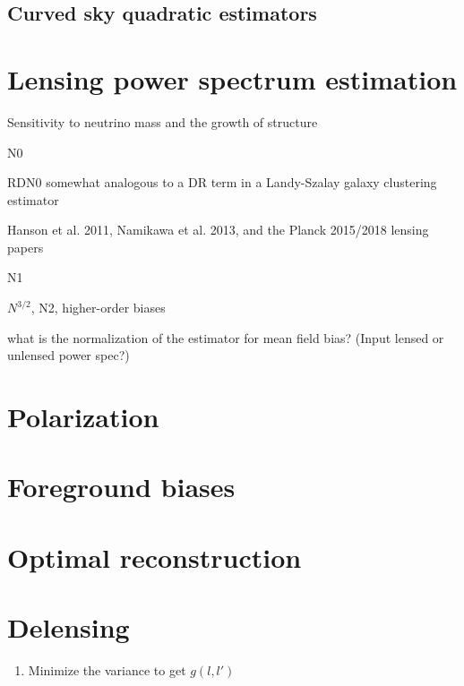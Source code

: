 \subsection{Curved sky quadratic estimators}


\section{Lensing power spectrum estimation}

Sensitivity to neutrino mass and the growth of structure


N0

RDN0 somewhat analogous to a DR term in a Landy-Szalay galaxy clustering estimator

Hanson et al. 2011, Namikawa et al. 2013, and the Planck 2015/2018 lensing papers 

\citep{Madhavacheril_2021} 

N1


$N^{3/2}$, N2, higher-order biases



what is the normalization of the  estimator for mean field bias?  (Input lensed or unlensed power spec?)


\section{Polarization}


\section{Foreground biases}


\section{Optimal reconstruction}

\section{Delensing}

\exercises

\begin{enumerate}
\item Minimize the variance to get $g(l,l')$
  
\end{enumerate}
